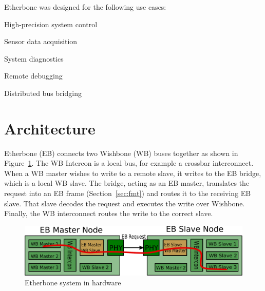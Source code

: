 \documentclass{article}
\newenvironment{packed_itemize}{
\begin{itemize}
  \setlength{\itemsep}{1pt}
  \setlength{\parskip}{0pt}
  \setlength{\parsep}{0pt}
}{\end{itemize}}
\begin{document}

Etherbone was designed for the following use cases:
\begin{packed_itemize}
\item High-precision system control
\item Sensor data acquisition
\item System diagnostics
\item Remote debugging
\item Distributed bus bridging
\end{packed_itemize}



\section{Architecture}

Etherbone (EB) connects two Wishbone (WB) buses together as shown in
Figure~\ref{fig:hw-system}.
The WB Intercon is a local bus, for example a crossbar interconnect.
When a WB master wishes to write to a remote slave, 
it writes to the EB bridge,
which is a local WB slave.
The bridge, acting as an EB master, 
translates the request into an EB frame
(Section~\ref{sec:fmt}) and routes it to
the receiving EB slave.
That slave decodes the request and executes the write over Wishbone.
Finally, the WB interconnect routes the write to the correct slave.

\begin{figure}[t]
\centering%
\includegraphics[width=\columnwidth]{system}
\caption{Etherbone system in hardware}
\label{fig:hw-system}
\end{figure}
\end{document}
